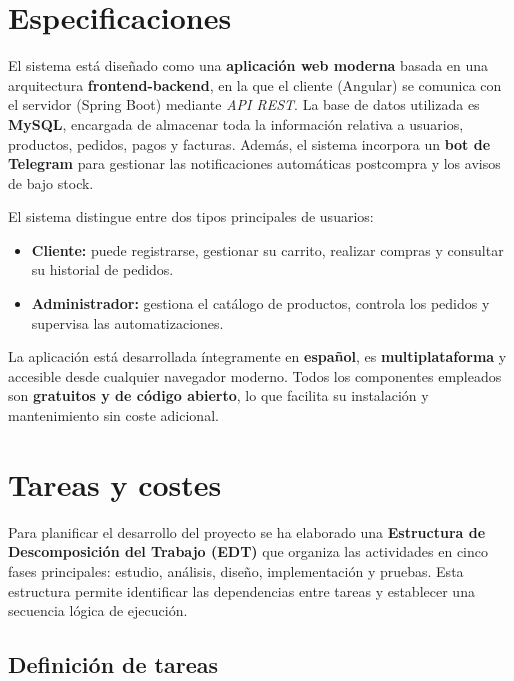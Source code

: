 \section{Especificaciones}

El sistema está diseñado como una \textbf{aplicación web moderna} basada en una arquitectura \textbf{frontend-backend}, en la que el cliente (Angular) se comunica con el servidor (Spring Boot) mediante \textit{API REST}. 
La base de datos utilizada es \textbf{MySQL}, encargada de almacenar toda la información relativa a usuarios, productos, pedidos, pagos y facturas. 
Además, el sistema incorpora un \textbf{bot de Telegram} para gestionar las notificaciones automáticas postcompra y los avisos de bajo stock.

El sistema distingue entre dos tipos principales de usuarios:

\begin{itemize}
    \item \textbf{Cliente:} puede registrarse, gestionar su carrito, realizar compras y consultar su historial de pedidos.
    \item \textbf{Administrador:} gestiona el catálogo de productos, controla los pedidos y supervisa las automatizaciones.
\end{itemize}

La aplicación está desarrollada íntegramente en \textbf{español}, es \textbf{multiplataforma} y accesible desde cualquier navegador moderno. 
Todos los componentes empleados son \textbf{gratuitos y de código abierto}, lo que facilita su instalación y mantenimiento sin coste adicional.

\section{Tareas y costes}

Para planificar el desarrollo del proyecto se ha elaborado una \textbf{Estructura de Descomposición del Trabajo (EDT)} que organiza las actividades en cinco fases principales: estudio, análisis, diseño, implementación y pruebas. 
Esta estructura permite identificar las dependencias entre tareas y establecer una secuencia lógica de ejecución.

\subsection{Definición de tareas}

